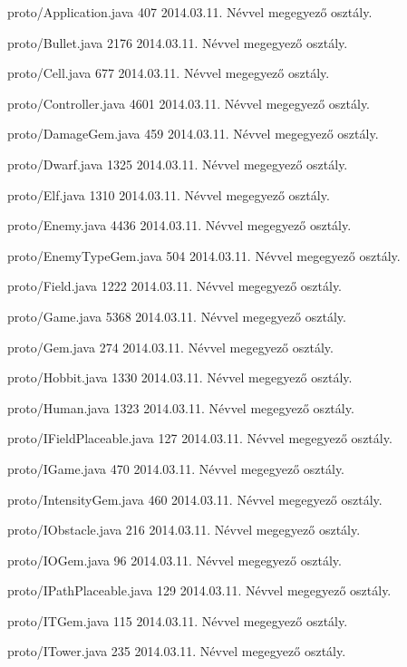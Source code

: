 \begin{fajllista}

\fajl
{proto/Application.java}
{407}
{2014.03.11.}
{Névvel megegyező osztály.}

\fajl
{proto/Bullet.java}
{2176}
{2014.03.11.}
{Névvel megegyező osztály.}

\fajl
{proto/Cell.java}
{677}
{2014.03.11.}
{Névvel megegyező osztály.}

\fajl
{proto/Controller.java}
{4601}
{2014.03.11.}
{Névvel megegyező osztály.}

\fajl
{proto/DamageGem.java}
{459}
{2014.03.11.}
{Névvel megegyező osztály.}

\fajl
{proto/Dwarf.java}
{1325}
{2014.03.11.}
{Névvel megegyező osztály.}

\fajl
{proto/Elf.java}
{1310}
{2014.03.11.}
{Névvel megegyező osztály.}

\fajl
{proto/Enemy.java}
{4436}
{2014.03.11.}
{Névvel megegyező osztály.}

\fajl
{proto/EnemyTypeGem.java}
{504}
{2014.03.11.}
{Névvel megegyező osztály.}

\fajl
{proto/Field.java}
{1222}
{2014.03.11.}
{Névvel megegyező osztály.}

\fajl
{proto/Game.java}
{5368}
{2014.03.11.}
{Névvel megegyező osztály.}

\fajl
{proto/Gem.java}
{274}
{2014.03.11.}
{Névvel megegyező osztály.}

\fajl
{proto/Hobbit.java}
{1330}
{2014.03.11.}
{Névvel megegyező osztály.}

\fajl
{proto/Human.java}
{1323}
{2014.03.11.}
{Névvel megegyező osztály.}

\fajl
{proto/IFieldPlaceable.java}
{127}
{2014.03.11.}
{Névvel megegyező osztály.}

\fajl
{proto/IGame.java}
{470}
{2014.03.11.}
{Névvel megegyező osztály.}

\fajl
{proto/IntensityGem.java}
{460}
{2014.03.11.}
{Névvel megegyező osztály.}

\fajl
{proto/IObstacle.java}
{216}
{2014.03.11.}
{Névvel megegyező osztály.}

\fajl
{proto/IOGem.java}
{96}
{2014.03.11.}
{Névvel megegyező osztály.}

\fajl
{proto/IPathPlaceable.java}
{129}
{2014.03.11.}
{Névvel megegyező osztály.}

\fajl
{proto/ITGem.java}
{115}
{2014.03.11.}
{Névvel megegyező osztály.}

\fajl
{proto/ITower.java}
{235}
{2014.03.11.}
{Névvel megegyező osztály.}


\end{fajllista}
